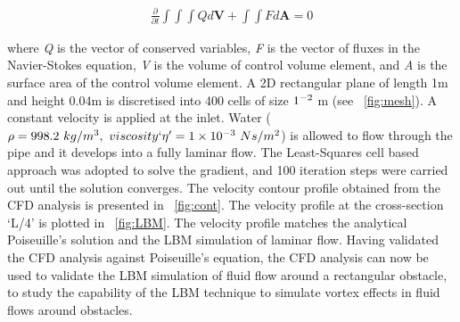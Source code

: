 \begin{eqnarray}
\frac{\partial}{\partial t} \int\int\int  Q d\mathbf{V} + \int\int \mathit{F} d\mathbf{A} = 0
\end{eqnarray}

where \textit{Q} is the vector of conserved variables, \textit{F} is the vector of fluxes in the Navier-Stokes equation, \textit{V} is the volume of control volume element, and \textit{A} is the surface area of the control volume element. A 2D rectangular plane of length 1m and height 0.04m is discretised into 400 cells of size $1 \time 10^{-2} $ m (see ~\cref{fig:mesh}). A constant velocity is applied at the inlet. Water ($\rho = 998.2\mbox{ }kg/m^{3},\mbox{ } viscosity`\eta'=1 \times 10^{-3}\mbox{ } Ns/m^{2} $) is allowed to flow through the pipe and it develops into a fully laminar flow. The Least-Squares cell based approach was adopted to solve the gradient, and 100 iteration steps were carried out until the solution converges. The velocity contour profile obtained from the CFD analysis is presented in ~\cref{fig:cont}. The velocity profile at the cross-section `L/4' is plotted in ~\cref{fig:LBM}. The velocity profile matches the analytical Poiseuille's solution and the LBM simulation of laminar flow. Having validated the CFD analysis against Poiseuille's equation, the CFD analysis can now be used to validate the LBM simulation of fluid flow around a rectangular obstacle, to study the capability of the LBM technique to simulate vortex effects in fluid flows around obstacles.

